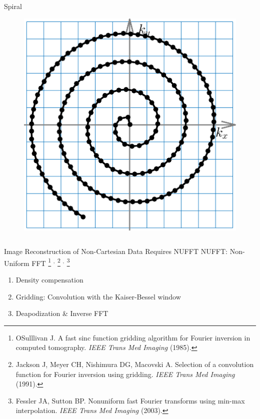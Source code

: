 \begin{frame}
\begin{columns}
		\begin{column}{0.35\textwidth}
			\centering
			Spiral
			\begin{figure}
				\includegraphics[width=\columnwidth]{fig/mri-trj-spiral.png}
			\end{figure}
		\end{column}
	\end{columns}

\end{frame}


\begin{frame}{Image Reconstruction of Non-Cartesian Data Requires NUFFT}
	NUFFT: Non-Uniform FFT \footnote{OSulllivan J. A fast sinc function gridding algorithm for Fourier inversion in computed tomography. \textit{IEEE Trans Med Imaging} (1985).}
	$^,$ \footnote{Jackson J, Meyer CH, Nishimura DG, Macovski A. Selection of a convolution function for Fourier inversion using gridding. \textit{IEEE Trans Med Imaging} (1991).}
	$^,$ \footnote{Fessler JA, Sutton BP. Nonuniform fast Fourier transforms using min-max interpolation. \textit{IEEE Trans Med Imaging} (2003).}
    \vspace{1em}
	\begin{enumerate}
		\item Density compensation
		\item Gridding: Convolution with the Kaiser-Bessel window
		\item Deapodization \& Inverse FFT
	\end{enumerate}
\end{frame}


